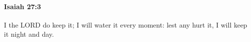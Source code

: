 
		\paragraph{Isaiah 27:3} %
			\label{ISAIAH-27-3}

			I the LORD do keep it; I will water it every moment: lest any hurt it, I will keep it night and day.


